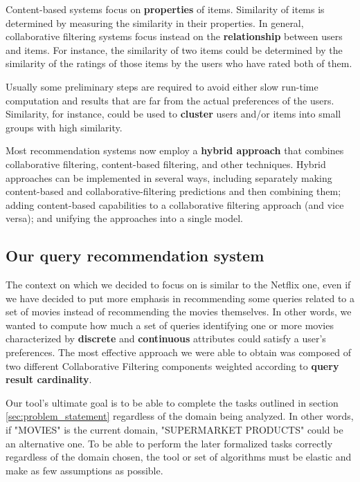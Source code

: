 Content-based systems focus on \textbf{properties} of items. Similarity of items is determined by measuring the similarity in their properties.\cite{Book-ch9}
In general, collaborative filtering systems focus instead on the \textbf{relationship} between users and items. For instance, the similarity of two items could be determined by the similarity of the ratings of those items by the users who have rated both of them.\cite{Book-ch9}

Usually some preliminary steps are required to avoid either slow run-time computation and results that are far from the actual preferences of the  users. Similarity, for instance, could be used to \textbf{cluster} users and/or items into small groups with high similarity. 


Most recommendation systems now employ a \textbf{hybrid approach} that combines collaborative filtering, content-based filtering, and other techniques. Hybrid approaches can be implemented in several ways, including separately making content-based and collaborative-filtering predictions and then combining them; adding content-based capabilities to a collaborative filtering approach (and vice versa); and unifying the approaches into a single model. \cite{hybrid-intro}

\subsection{Our query recommendation system}
The context on which we decided to focus on is similar to the Netflix one, even if we have decided to put more emphasis in recommending some queries related to a set of movies instead of recommending the movies themselves. In other words, we wanted to compute how much a set of queries identifying one or more movies characterized by \textbf{discrete} and \textbf{continuous} attributes could satisfy a user's preferences. The most effective approach we were able to obtain was composed of two different Collaborative Filtering components weighted according to \textbf{query result cardinality}.


Our tool's ultimate goal is to be able to complete the tasks outlined in section \ref{sec:problem_statement} regardless of the domain being analyzed. In other words, if "MOVIES" is the current domain, "SUPERMARKET PRODUCTS" could be an alternative one. To be able to perform the later formalized tasks correctly regardless of the domain chosen, the tool or set of algorithms must be elastic and make as few assumptions as possible. 

